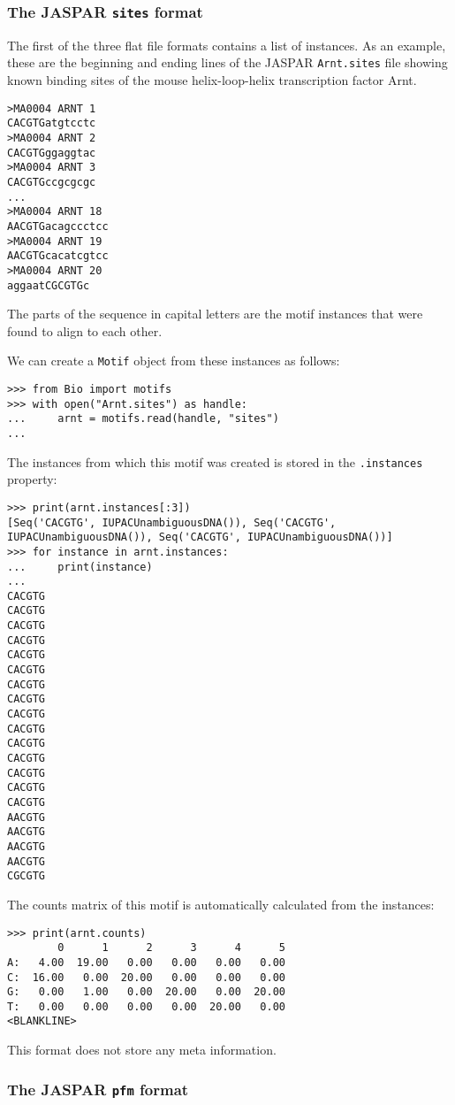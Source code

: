 \subsubsection*{The JASPAR \texttt{sites} format}

The first of the three flat file formats contains a list of instances. As an example, these are the beginning and ending lines of the JASPAR \verb+Arnt.sites+ file showing known binding sites of the mouse helix-loop-helix transcription factor Arnt.
\begin{verbatim}
>MA0004 ARNT 1
CACGTGatgtcctc
>MA0004 ARNT 2
CACGTGggaggtac
>MA0004 ARNT 3
CACGTGccgcgcgc
...
>MA0004 ARNT 18
AACGTGacagccctcc
>MA0004 ARNT 19
AACGTGcacatcgtcc
>MA0004 ARNT 20
aggaatCGCGTGc
\end{verbatim}
The parts of the sequence in capital letters are the motif instances that were found to align to each other.

We can create a \verb+Motif+ object from these instances as follows:
\begin{verbatim}
>>> from Bio import motifs
>>> with open("Arnt.sites") as handle:
...     arnt = motifs.read(handle, "sites")
...
\end{verbatim}
The instances from which this motif was created is stored in the \verb+.instances+ property:
\begin{verbatim}
>>> print(arnt.instances[:3])
[Seq('CACGTG', IUPACUnambiguousDNA()), Seq('CACGTG', IUPACUnambiguousDNA()), Seq('CACGTG', IUPACUnambiguousDNA())]
>>> for instance in arnt.instances:
...     print(instance)
...
CACGTG
CACGTG
CACGTG
CACGTG
CACGTG
CACGTG
CACGTG
CACGTG
CACGTG
CACGTG
CACGTG
CACGTG
CACGTG
CACGTG
CACGTG
AACGTG
AACGTG
AACGTG
AACGTG
CGCGTG
\end{verbatim}
The counts matrix of this motif is automatically calculated from the instances:
\begin{verbatim}
>>> print(arnt.counts)
        0      1      2      3      4      5
A:   4.00  19.00   0.00   0.00   0.00   0.00
C:  16.00   0.00  20.00   0.00   0.00   0.00
G:   0.00   1.00   0.00  20.00   0.00  20.00
T:   0.00   0.00   0.00   0.00  20.00   0.00
<BLANKLINE>
\end{verbatim}
This format does not store any meta information.

\subsubsection*{The JASPAR \texttt{pfm} format}

